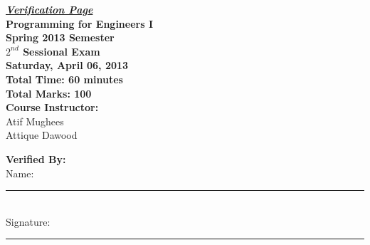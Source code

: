 \documentclass[12pt,a4paper]{article}
\begin{document}
\begin{center}
{\Huge \underline{\textbf{\textit{Verification Page}}}}\\[1.75cm]
{\LARGE \textbf{Programming for Engineers I}}\\[0.15cm]
{\normalsize \textbf{Spring 2013 Semester}}\\[0.15cm]
{\Large \textbf{$2^{nd}$ Sessional Exam}}\\[0.15cm]
{\normalsize \textbf{Saturday, April 06, 2013}}\\[0.45cm]
{\Large \textbf{Total Time: 60 minutes}}\\[0.15cm]
{\Large \textbf{Total Marks: 100}}\\[0.35cm]
\textbf{Course Instructor:}\\
Atif Mughees\\
Attique Dawood\\[0.5cm]
\end{center}
\textbf{Verified By:}\\[0.55cm]
Name: \rule{5.65cm}{0.2mm}\\[0.55cm]
Signature: \rule{5cm}{0.2mm}\\[0.55cm]
\end{document}
